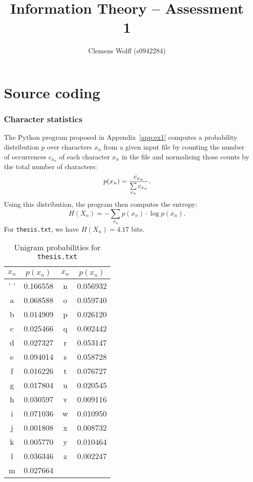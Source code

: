 \documentclass[10pt,a4paper,oneside,onecolumn]{article}
\title{Information Theory -- Assessment 1}
\author{Clemens Wolff (s0942284)}
\date{\vspace{-2em}}
\newcommand*{\thesisTXT}{{\tt thesis.txt}\xspace}
\begin{document}
\maketitle\thispagestyle{fancy}


\part{Source coding}


\section{Character statistics}\label{sec:ex1}

The Python program proposed in Appendix~\ref{app:ex1} computes a probability
distribution $p$ over characters $x_n$ from a given input file by counting the
number of occurrences $c_{x_n}$ of each character $x_n$ in the file and
normalising those counts by the total number of characters:
\begin{equation}
    p(x_n) = {c_{x_n} \over\sum\limits_{x_n} c_{x_n}}.
\end{equation}
Using this distribution\footnotemark, the program then computes the entropy:
\begin{equation}
    H(X_n) = -\sum\limits_{x_n} p(x_n) \cdot \log p(x_n).
\end{equation}
For \thesisTXT, we have $H(X_n) = 4.17$ bits.\footnotemark
{}

\begin{table}[ht]
\centering
\begin{tabular}{| c c | c c |}
\hline
$x_n$ & $p(x_n)$ & $x_n$ & $p(x_n)$ \\
\hline
 ' '  & 0.166558 &   n   & 0.056932 \\
  a   & 0.068588 &   o   & 0.059740 \\
  b   & 0.014909 &   p   & 0.026120 \\
  c   & 0.025466 &   q   & 0.002442 \\
  d   & 0.027327 &   r   & 0.053147 \\
  e   & 0.094014 &   s   & 0.058728 \\
  f   & 0.016226 &   t   & 0.076727 \\
  g   & 0.017804 &   u   & 0.020545 \\
  h   & 0.030597 &   v   & 0.009116 \\
  i   & 0.071036 &   w   & 0.010950 \\
  j   & 0.001808 &   x   & 0.008732 \\
  k   & 0.005770 &   y   & 0.010464 \\
  l   & 0.036346 &   z   & 0.002247 \\
  m   & 0.027664 &       &          \\
\hline
\end{tabular}
\caption{Unigram probabilities for \thesisTXT}
\label{tbl:unigram-probs}
\end{table}
\end{document}
